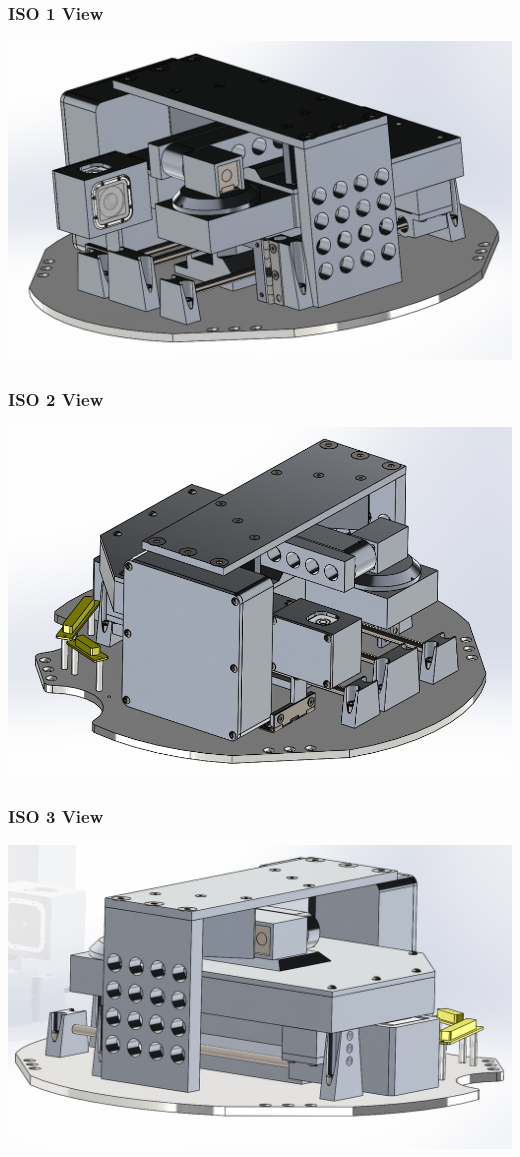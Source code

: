 \subsubsection{ISO 1 View}
\includegraphics[width=\textwidth]{./images/CAD/ISO_1}
\subsubsection{ISO 2 View}
\includegraphics[width=\textwidth]{./images/CAD/ISO_2}
\subsubsection{ISO 3 View}
\includegraphics[width=\textwidth]{./images/CAD/ISO_3}
